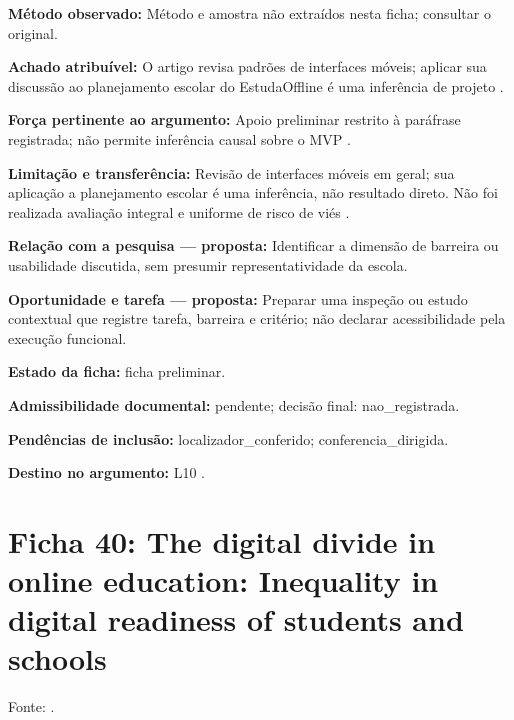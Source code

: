 \noindent\textbf{Método observado:} Método e amostra não extraídos nesta ficha; consultar o original.\par\medskip

\noindent\textbf{Achado atribuível:} O artigo revisa padrões de interfaces móveis; aplicar sua discussão ao planejamento escolar do EstudaOffline é uma inferência de projeto \citep{punchoojit2017}.\par\medskip

\noindent\textbf{Força pertinente ao argumento:} Apoio preliminar restrito à paráfrase registrada; não permite inferência causal sobre o MVP \citep{punchoojit2017}.\par\medskip

\noindent\textbf{Limitação e transferência:} Revisão de interfaces móveis em geral; sua aplicação a planejamento escolar é uma inferência, não resultado direto. Não foi realizada avaliação integral e uniforme de risco de viés \citep{punchoojit2017}.\par\medskip

\noindent\textbf{Relação com a pesquisa — proposta:} Identificar a dimensão de barreira ou usabilidade discutida, sem presumir representatividade da escola.\par\medskip

\noindent\textbf{Oportunidade e tarefa — proposta:} Preparar uma inspeção ou estudo contextual que registre tarefa, barreira e critério; não declarar acessibilidade pela execução funcional.\par\medskip

\noindent\textbf{Estado da ficha:} ficha preliminar.\par\medskip

\noindent\textbf{Admissibilidade documental:} pendente; decisão final: nao\_registrada.\par\medskip

\noindent\textbf{Pendências de inclusão:} localizador\_conferido; conferencia\_dirigida.\par\medskip

\noindent\textbf{Destino no argumento:} L10 .

\clearpage\section*{Ficha 40: The digital divide in online education: Inequality in digital readiness of students and schools}

Fonte: \citet{werfhorst2022}.

